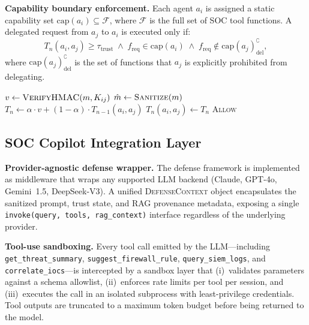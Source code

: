 \textbf{Capability boundary enforcement.}
Each agent $a_i$ is assigned a static capability set
$\text{cap}(a_i) \subseteq \mathcal{F}$, where $\mathcal{F}$ is
the full set of SOC tool functions.  A delegated request from $a_j$
to $a_i$ is executed only if:
\begin{equation}
  T_n(a_i, a_j) \ge \tau_{\text{trust}} \;\wedge\;
  f_{\text{req}} \in \text{cap}(a_i) \;\wedge\;
  f_{\text{req}} \notin \text{cap}(a_j)^{\complement}_{\text{del}},
  \label{eq:capcheck}
\end{equation}
where $\text{cap}(a_j)^{\complement}_{\text{del}}$ is the set of
functions that $a_j$ is explicitly prohibited from delegating.

\begin{algorithm}[t]
\caption{Inter-Agent Trust Verification}\label{alg:trust}
\BlankLine
{}
$v \gets \textsc{VerifyHMAC}(m, K_{ij})$\;
$\hat{m} \gets \textsc{Sanitize}(m)$ 
$T_n \gets \alpha \cdot v + (1-\alpha) \cdot T_{n-1}(a_i, a_j)$\;
$T_n(a_i, a_j) \gets T_n$\;
\Return \textsc{Allow}\;
\end{algorithm}

\subsection{SOC Copilot Integration Layer}
\label{sec:defense:soc}

\textbf{Provider-agnostic defense wrapper.}
The defense framework is implemented as middleware that wraps any
supported LLM backend (Claude, GPT-4o, Gemini~1.5, DeepSeek-V3).
A unified \textsc{DefenseContext} object encapsulates the sanitized
prompt, trust state, and RAG provenance metadata, exposing a single
\texttt{invoke(query, tools, rag\_context)} interface regardless of
the underlying provider.

\textbf{Tool-use sandboxing.}
Every tool call emitted by the LLM---including
\texttt{get\_threat\_summary},
\texttt{suggest\_firewall\_rule},
\texttt{query\_siem\_logs}, and
\texttt{correlate\_iocs}---is
intercepted by a sandbox layer that (i)~validates parameters against
a schema allowlist, (ii)~enforces rate limits per tool per session,
and (iii)~executes the call in an isolated subprocess with
least-privilege credentials.  Tool outputs are truncated to a
maximum token budget before being returned to the model.

